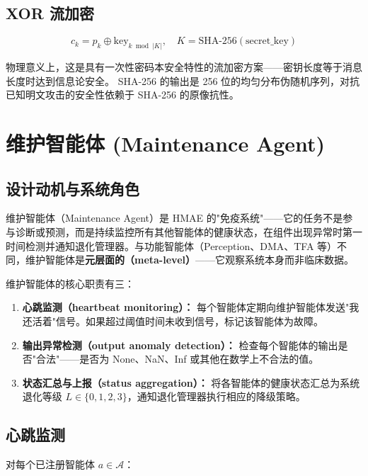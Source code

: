 \documentclass[11pt,a4paper]{ctexart}
\theoremstyle{remark}
\begin{document}
\subsection{XOR 流加密}

\begin{equation}
c_k = p_k \oplus \text{key}_{k \bmod |K|}, \quad K = \text{SHA-256}(\text{secret\_key})
\end{equation}

物理意义上，这是具有一次性密码本安全特性的流加密方案——密钥长度等于消息长度时达到信息论安全。
SHA-256 的输出是 256 位的均匀分布伪随机序列，对抗已知明文攻击的安全性依赖于 SHA-256 的原像抗性。

\section{维护智能体 (Maintenance Agent)}

\subsection{设计动机与系统角色}

维护智能体（Maintenance Agent）是 HMAE 的"免疫系统"——它的任务不是参与诊断或预测，而是持续监控所有其他智能体的健康状态，在组件出现异常时第一时间检测并通知退化管理器。与功能智能体（Perception、DMA、TFA 等）不同，维护智能体是\textbf{元层面的（meta-level）}——它观察系统本身而非临床数据。

维护智能体的核心职责有三：
\begin{enumerate}[nosep]
\item \textbf{心跳监测（heartbeat monitoring）：} 每个智能体定期向维护智能体发送"我还活着"信号。如果超过阈值时间未收到信号，标记该智能体为故障。
\item \textbf{输出异常检测（output anomaly detection）：} 检查每个智能体的输出是否"合法"——是否为 None、NaN、Inf 或其他在数学上不合法的值。
\item \textbf{状态汇总与上报（status aggregation）：} 将各智能体的健康状态汇总为系统退化等级 $L \in \{0,1,2,3\}$，通知退化管理器执行相应的降级策略。
\end{enumerate}

\subsection{心跳监测}

对每个已注册智能体 $a \in \mathcal{A}$：
\end{document}
